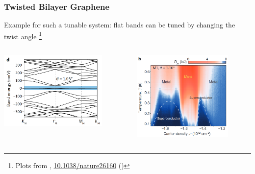 \documentclass[aspectratio=169]{beamer}
\begin{document}
\begin{frame}
	\frametitle{Twisted Bilayer Graphene}
	
	Example for such a tunable system: flat bands can be tuned by changing the twist angle \footnote{Plots from \citeauthor{caoUnconventionalSuperconductivityMagicangle2018},  \href{https://doi.org/10.1038/nature26160}{10.1038/nature26160} (\citeyear{caoUnconventionalSuperconductivityMagicangle2018})}
	
	\begin{columns}[T]
		\begin{column}{0.5\textwidth}
			\begin{center}
				\includegraphics[width=0.8\textwidth]{figs/TBG band structure}
			\end{center}
		\end{column}
		\begin{column}{0.5\textwidth}
			\begin{center}
				\includegraphics[width=0.8\textwidth]{figs/TBG SC experiment}
			\end{center}
		\end{column}
	\end{columns}
\end{frame}
\end{document}
